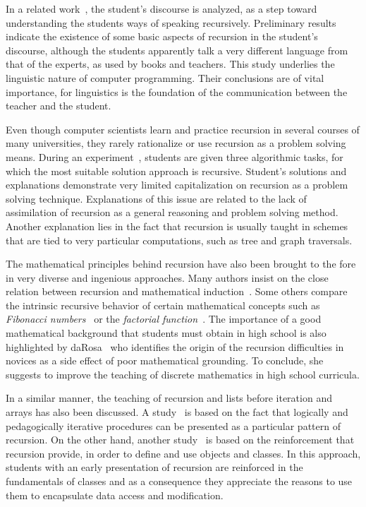 In a related work~\cite{Kimura:1977}, the student's discourse is
analyzed, as a step toward understanding the students ways of speaking
recursively. Preliminary results indicate the existence of some basic
aspects of recursion in the student's discourse, although the students
apparently talk a very different language from that of the experts,
as used by books and teachers. This study underlies the linguistic
nature of computer programming. Their conclusions are of vital
importance, for linguistics is the foundation of the communication
between the teacher and the student.

Even though computer scientists learn and practice recursion in
several courses of many universities, they rarely rationalize or
use recursion as a problem solving means. During an
experiment~\cite{Ginat:2004}, students are given three algorithmic
tasks, for which the most suitable solution approach is recursive.
Student's solutions and explanations demonstrate very limited
capitalization on recursion as a problem solving technique.
Explanations of this issue are related to the lack of assimilation
of recursion as a general reasoning and problem solving method.
Another explanation lies in the fact that recursion is usually
taught in schemes that are tied to very particular computations,
such as tree and graph traversals.

The mathematical principles behind recursion have also been brought
to the fore in very diverse and ingenious approaches. Many authors
insist on the close relation between recursion and mathematical
induction~\cite{LeronZazkis:1986, BrandtRichey:2004, Polycarpou:2006}.
Some others compare the intrinsic recursive behavior of certain
mathematical concepts such as \emph{Fibonacci
  numbers}~\cite{RubioHernan:2007} or the \emph{factorial
function}~\cite{Wu:1993}. The importance of a good mathematical
background that students must obtain in high school is also
highlighted by daRosa~\cite{daRosa:2002} who identifies the origin
of the recursion difficulties in novices as a side effect of poor
mathematical grounding. To conclude, she suggests to improve the
teaching of discrete mathematics in high school curricula.

In a similar manner, the teaching of recursion and lists before
iteration and arrays has also been discussed. A
study~\cite{TurbakRoydenStephanHerbst:1999} is based on the fact
that logically and pedagogically iterative procedures can be
presented as a particular pattern of recursion. On the other hand,
another study~\cite{BruceDanylukMurtagh:2005} is based on the
reinforcement that recursion provide, in order to define and use
objects and classes. In this approach, students with an early
presentation of recursion are reinforced in the fundamentals of
classes and as a consequence they appreciate the reasons to use them
to encapsulate data access and modification.

